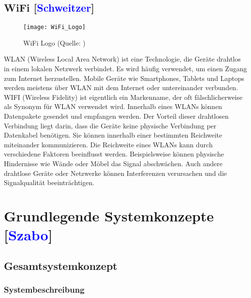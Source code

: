 \documentclass[titlepage,12pt,twoside]{article}
\begin{document}
\subsection{WiFi [\textcolor{blue}{Schweitzer}]}
\label{chap:WiFi}
\begin{figure}[H]
	\begin{center}
		\scalebox{0.5}
		{\texttt{[image: WiFi\_Logo]}}
		\caption{WiFi Logo (Quelle: \textcolor{blue}{\cite{WIFIabbildung}})}
		\label{fig:WiFi_Logo}
	\end{center}
\end{figure}
\hfill \break
WLAN (Wireless Local Area Network) ist eine Technologie, die Geräte drahtlos in einem lokalen Netzwerk verbindet. Es wird häufig verwendet, um einen Zugang zum Internet herzustellen. Mobile Geräte wie Smartphones, Tablets und Laptops werden meistens über WLAN mit dem Internet oder untereinander verbunden.
WIFI (Wireless Fidelity) ist eigentlich ein Markenname, der oft fälschlicherweise als Synonym für WLAN verwendet wird. 
Innerhalb eines WLANs können Datenpakete gesendet und empfangen werden. Der Vorteil dieser drahtlosen Verbindung liegt darin, dass die Geräte keine physische Verbindung per Datenkabel benötigen. Sie können innerhalb einer bestimmten Reichweite miteinander kommunizieren.
Die Reichweite eines WLANs kann durch verschiedene Faktoren beeinflusst werden. Beispielsweise können physische Hindernisse wie Wände oder Möbel das Signal abschwächen. Auch andere drahtlose Geräte oder Netzwerke können Interferenzen verursachen und die Signalqualität beeinträchtigen. \\


\section{Grundlegende Systemkonzepte [\textcolor{blue}{Szabo}]}
\label{chap:Grundlegende Systemkonzepte}

\subsection{Gesamtsystemkonzept}
\label{chap:Gesamtsystemkonzept}

\subsubsection{Systembeschreibung}
\end{document}
